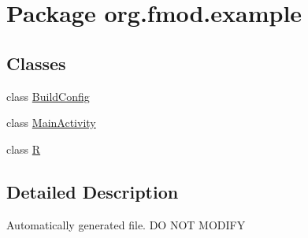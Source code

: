 \hypertarget{namespaceorg_1_1fmod_1_1example}{\section{Package org.\+fmod.\+example}
\label{namespaceorg_1_1fmod_1_1example}
}
\subsection*{Classes}
\begin{DoxyCompactItemize}
\item 
class \hyperlink{classorg_1_1fmod_1_1example_1_1_build_config}{Build\+Config}
\item 
class \hyperlink{classorg_1_1fmod_1_1example_1_1_main_activity}{Main\+Activity}
\item 
class \hyperlink{classorg_1_1fmod_1_1example_1_1_r}{R}
\end{DoxyCompactItemize}


\subsection{Detailed Description}
Automatically generated file. D\+O N\+O\+T M\+O\+D\+I\+F\+Y 